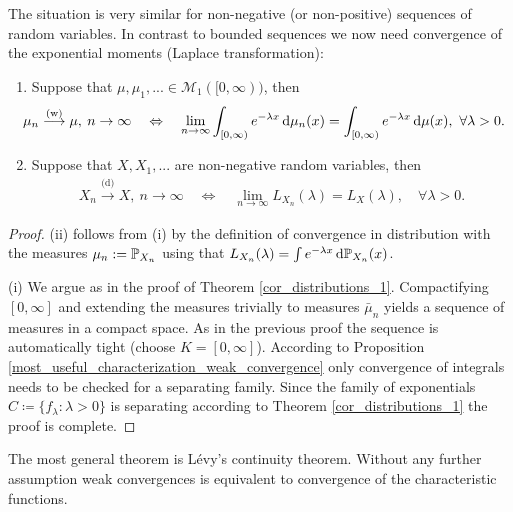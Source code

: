 The situation is very similar for non-negative (or non-positive) sequences of random variables. In contrast to bounded sequences we now need convergence of the exponential moments (Laplace transformation):
\begin{lsatzwichtig}
	\begin{theorem}
		\begin{enumerate}[label=(\roman*)]
			\item Suppose that $\mu,\mu_1,...\in \mathcal M_1([0,\infty))$, then 
		\begin{align*}
		\hspace{-4mm}	\mu_n \overset{\text{(w)}}{\longrightarrow} \mu,\: n \to \infty \quad\Leftrightarrow \quad \lim_{n\to\infty}\int_{[0,\infty)} e^{-\lambda x}\dint \mu_n(x)=\int_{[0,\infty)} e^{-\lambda x}\dint \mu(x),\,\, \forall \lambda >0.
		\end{align*}
		\item Suppose that $X,X_1,...$ are non-negative random variables, then 
		\begin{align*}
			X_n \overset{\text{(d)}}{\longrightarrow} X,\: n \to \infty \quad\Leftrightarrow \quad \lim_{n\to\infty} L_{X_n}(\lambda)=L_X(\lambda), \quad\forall \lambda>0.
		\end{align*}
	\end{enumerate}
	\end{theorem}
	\end{lsatzwichtig}
	\begin{proof}[Proof]
		(ii) follows from (i) by the definition of convergence in distribution with the measures $\mu_n:=\P_{X_n}$ using that $L_{X_n}(\lambda)=\int e^{-\lambda x} \dint \P_{X_n}(x)$.\smallskip
	
		(i) We argue as in the proof of Theorem \ref{cor_distributions_1}. Compactifying $[0,\infty]$ and extending the measures trivially to measures $\bar \mu_n$ yields a sequence of measures in a compact space. As in the previous proof the sequence is automatically tight (choose $K=[0,\infty]$). 
		According to Proposition \ref{most_useful_characterization_weak_convergence} only convergence of integrals needs to be checked for a separating family. Since the family of exponentials $C\coloneqq \{ f_{\lambda} \colon \lambda > 0 \}$ is separating according to Theorem \ref{cor_distributions_1} the proof is complete.
	\end{proof}
The most general theorem is L\'evy's continuity theorem. Without any further assumption weak convergences is equivalent to convergence of the characteristic functions. 

